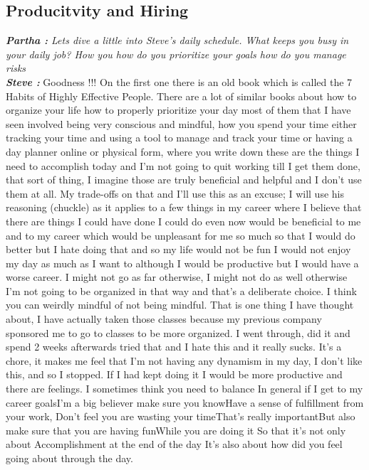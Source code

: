 \documentclass[a4paper, 12pt]{article}
\begin{document}
\begin{flushleft}
        \section*{Producitvity and Hiring}
        \textit {\textbf {Partha :} Lets dive a little into Steve’s daily schedule. What keeps you busy in your daily job? How you how do you prioritize your goals how do you manage risks } \\
        \textit {\textbf {Steve :}} Goodness !!! On the first one there is an old book which is called the 7 Habits of Highly Effective People. There are a lot of similar books about how to organize your life how to properly prioritize your day most of them that I have seen involved being very conscious and mindful, how you spend your time either tracking your time and using a tool to manage and track your time or having a day planner online or physical form, where you write down these are the things I need to accomplish today and I'm not going to quit working till I get them done, that sort of thing, I imagine those are truly beneficial and helpful and I don't use them at all. My trade-offs on that and I'll use this as an excuse; I will use his reasoning (chuckle) as it applies to a few things in my career where I believe that there are things I could have done I could do even now would be beneficial to me and to my career which would be unpleasant for me so much so that I would do better but I hate doing that and so my life would not be fun I would not enjoy my day as much as I want to although I would be productive but I would have a worse career. I might not go as far otherwise, I might not do as well otherwise I'm not going to be organized in that way and that's a deliberate choice. I think you can weirdly  mindful of not being mindful. That is one thing I have thought about, I have actually taken those classes because my previous company sponsored me to go to classes to be more organized. I went through, did it and spend 2 weeks afterwards tried that and I hate this and it really sucks. It's a chore, it makes me feel that I'm not having any dynamism in my day, I don’t like this, and so I stopped. If I had kept doing it I would be more productive and there are feelings. I sometimes think you need to balance In general if I get to my career goalsI'm a big believer make sure you knowHave a sense of fulfillment from your work, Don't feel you are wasting your timeThat's really importantBut also make sure that you are having funWhile you are doing it So that it's not only about Accomplishment at the end of the day It's also about how did you feel going about  through the day. \\

\end{flushleft}
\end{document}
